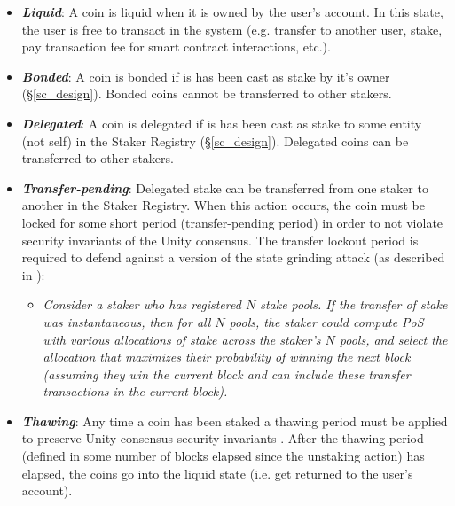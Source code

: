 \begin{itemize}
    \item \textbf{\textit{Liquid}}: A coin is liquid when it is owned by the user's account. In this state, the user is free to transact in the system (e.g. transfer to another user, stake, pay transaction fee for smart contract interactions, etc.).
    \item \textbf{\textit{Bonded}}: A coin is bonded if is has been cast as stake by it's owner (\S\ref{sc_design}). Bonded coins cannot be transferred to other stakers.
    \item \textbf{\textit{Delegated}}: A coin is delegated if is has been cast as stake to some entity (not self) in the Staker Registry (\S\ref{sc_design}). Delegated coins can be transferred to other stakers.
    \item \textbf{\textit{Transfer-pending}}: Delegated stake can be transferred from one staker to another in the Staker Registry. When this action occurs, the coin must be locked for some short period (transfer-pending period) in order to not violate security invariants of the Unity consensus. The transfer lockout period is required to defend against a version of the state grinding attack (as described in \cite{WZS19}): 
    \begin{itemize} [label=,nosep]
        \item \textit{Consider a staker who has registered $N$ stake pools. If the transfer of stake was instantaneous, then for all $N$ pools, the staker could compute PoS  with various allocations of stake across the staker's $N$ pools, and select the allocation that maximizes their probability of winning the next block (assuming they win the current block and can include these transfer transactions in the current block).}  
    \end{itemize}
    \item \textbf{\textit{Thawing}}: Any time a coin has been staked a thawing period must be applied to preserve Unity consensus security invariants \cite{WZS19}. After the thawing period (defined in some number of blocks elapsed since the unstaking action) has elapsed, the coins go into the liquid state (i.e. get returned to the user's account). 
\end{itemize}

